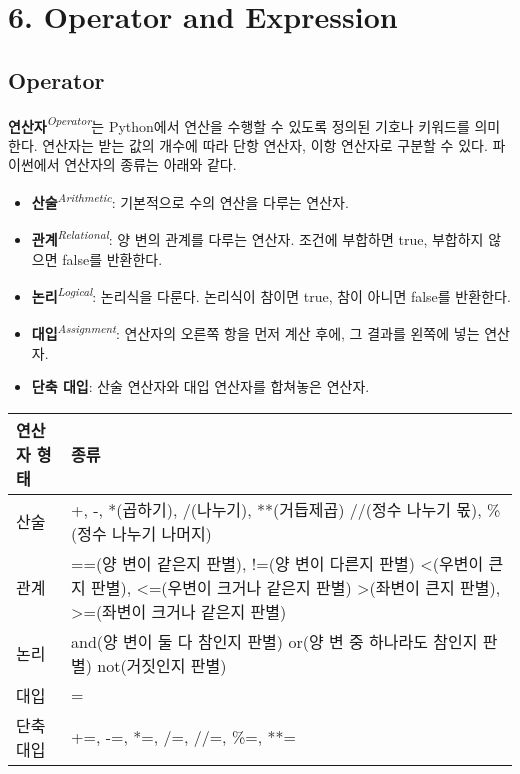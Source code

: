 \section[{6. Operator and Expression - {\it 연산자와 표현식}}]{6. Operator and Expression}

\subsection{Operator}

\textbf{연산자}\textit{\textsuperscript{Operator}}는 Python에서 연산을 수행할 수 있도록 정의된 기호나 키워드를 의미한다. 연산자는 받는 값의 개수에 따라 단항 연산자, 이항 연산자로 구분할 수 있다. 파이썬에서 연산자의 종류는 아래와 같다.

\begin{itemize}
    \item \textbf{산술}\textit{\textsuperscript{Arithmetic}}: 기본적으로 수의 연산을 다루는 연산자.
    \item \textbf{관계}\textit{\textsuperscript{Relational}}: 양 변의 관계를 다루는 연산자. 조건에 부합하면 true, 부합하지 않으면 false를 반환한다.
    \item \textbf{논리}\textit{\textsuperscript{Logical}}: 논리식을 다룬다. 논리식이 참이면 true, 참이 아니면 false를 반환한다.
    \item \textbf{대입}\textit{\textsuperscript{Assignment}}: 연산자의 오른쪽 항을 먼저 계산 후에, 그 결과를 왼쪽에 넣는 연산자.
    \item \textbf{단축 대입}: 산술 연산자와 대입 연산자를 합쳐놓은 연산자.
\end{itemize}

\begin{longtable}[]{@{}p{3cm} p{11cm}@{}}
    \toprule
        연산자 형태 & 종류 \\
        \midrule
        \endhead
        산술 & +, -, *(곱하기), /(나누기), **(거듭제곱)\newline
        //(정수 나누기 몫), \%(정수 나누기 나머지) \\
        관계 & ==(양 변이 같은지 판별), !=(양 변이 다른지 판별)\newline
        \textless(우변이 큰지 판별), \textless=(우변이 크거나 같은지 판별)\newline
        \textgreater(좌변이 큰지 판별), \textgreater=(좌변이 크거나 같은지 판별) \\
        논리 & and(양 변이 둘 다 참인지 판별)\newline
        or(양 변 중 하나라도 참인지 판별)\newline
        not(거짓인지 판별) \\
        대입 & = \\
        단축 대입 & +=, -=, *=, /=, //=, \%=, **= \\
    \bottomrule
\end{longtable}

